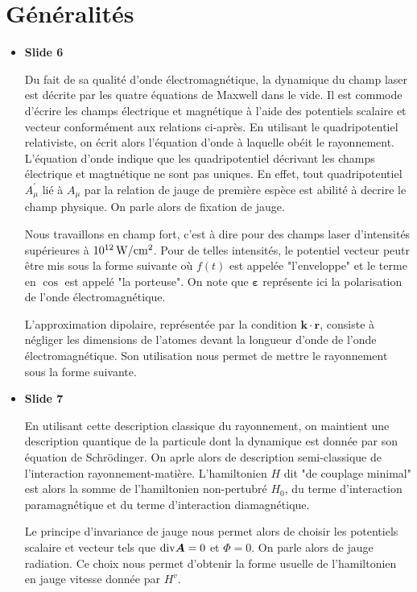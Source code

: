 \documentclass[10pt,a4paper]{article}
\begin{document}
\section{G\'en\'eralit\'es}

\begin{itemize}
\item \textbf{Slide 6}\par
Du fait de sa qualit\'e d'onde \'electromagn\'etique, 
la dynamique du champ laser est d\'ecrite par les quatre 
\'equations de Maxwell dans le vide.
Il est commode d'\'ecrire les champs \'electrique et magn\'etique 
\`a l'aide des potentiels scalaire et vecteur 
conform\'ement aux relations ci-apr\`es.
En utilisant le quadripotentiel relativiste, 
on \'ecrit alors l'\'equation d'onde \`a laquelle ob\'eit le rayonnement.
L'\'equation d'onde indique que les quadripotentiel 
d\'ecrivant les champs \'electrique et magtn\'etique
ne sont pas uniques. En effet, tout quadripotentiel $A_\mu^\prime$ 
li\'e \`a $A_\mu$ par la relation de jauge de premi\`ere esp\`ece
est abilit\'e \`a decrire le champ physique.
On parle alors de fixation de jauge.

Nous travaillons en champ fort, 
c'est \`a dire pour des champs laser d'intensit\'es sup\'erieures \`a 
$10^{12}\,\rm W/cm^2$.
Pour de telles intensit\'es, le potentiel vecteur 
peutr \^etre mis sous la forme suivante 
o\`u $f(t)$ est appel\'ee "l'enveloppe" et le terme en $\cos$ est appel\'e
"la porteuse".
On note que $\boldsymbol{\varepsilon}$ repr\'esente ici la 
polarisation de l'onde \'electromagn\'etique.

L'approximation dipolaire, repr\'esent\'ee par la condition 
$\boldsymbol{k}\cdot\boldsymbol{r}$, consiste \`a n\'egliger 
les dimensions de l'atomes devant la longueur d'onde de l'onde
\'electromagn\'etique. Son utilisation nous permet de 
mettre le rayonnement sous la forme suivante.

\item \textbf{Slide 7}\par
En utilisant cette description classique du rayonnement, 
on maintient une description quantique de la particule dont la dynamique 
est donn\'ee par son \'equation de Schr\"odinger.
On aprle alors de description semi-classique de
l'interaction rayonnement-mati\`ere.
L'hamiltonien $H$ dit "de couplage minimal" est alors la somme de 
l'hamiltonien  non-pertubr\'e $H_0$, 
du terme d'interaction paramagn\'etique 
et du terme d'interaction diamagn\'etique.

Le principe d'invariance de jauge nous permet alors de choisir les 
potentiels scalaire et vecteur tels que ${\rm div}\boldsymbol{A}=0$
et $\Phi=0$. On parle alors de jauge radiation.
Ce choix nous permet d'obtenir la forme usuelle de
l'hamiltonien en jauge vitesse donn\'ee par $H^v$.


\end{itemize}
\end{document}

